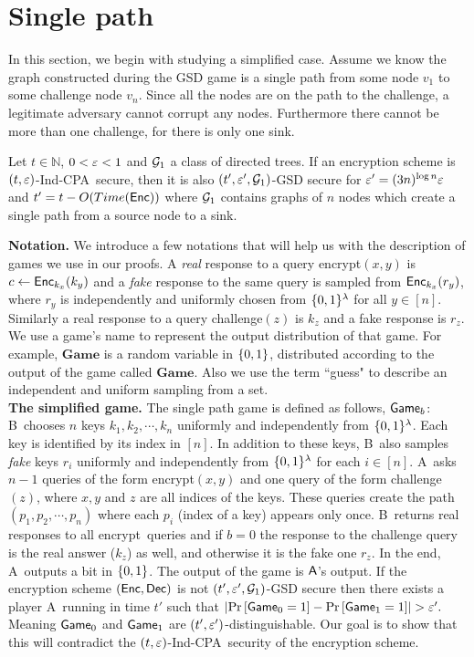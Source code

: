 \documentclass{article}
\newcommand{\tcpa}{$(t,\eps)$-Ind-CPA}
\def\B{{\sf B}}
\def\A{{\sf A}}
\newcommand{\encrypt}{{\sf encrypt}}
\newcommand{\game}{{\sf Game}}
\newcommand{\dgame}{{\mathbf{Game}}}
\def\challenge{{\sf challenge}}
\begin{document}
\section{Single path} %

In this section, we begin with studying a simplified case. Assume we know the graph constructed during the GSD game is a single path from some node $v_1$ to some challenge node $v_n$. Since all the nodes are on the path to the challenge, a legitimate adversary cannot corrupt any nodes. Furthermore there cannot be more than one challenge, for there is only one sink. 

\begin{theorem}\label{thm:s1in-1out}
Let $t \in \mathbb{N}$, $0<\varepsilon<1$ and ${\cal G}_1$ a class of directed trees. If an encryption scheme is \tcpa~secure, then it is also $(t',\varepsilon',{\cal G}_1)$-GSD secure for $\varepsilon'=(3n)^{\log n} \varepsilon $ and $t'=t-O(Time({\sf Enc}))$ where ${\cal G}_1$ contains graphs of $n$ nodes which create a single path from a source node to a sink.
\end{theorem}

  \textbf{Notation.} We introduce a few notations that will help us with the description of games we use in our proofs. A \textit{real} response to a query \encrypt$(x,y)$ is $c\leftarrow {\sf Enc}_{k_x}(k_{y})$ and a \textit{fake} response to the same query is sampled from ${\sf Enc}_{k_x}(r_{y})$, where $r_y$ is independently and uniformly chosen from $\{0,1\}^\lambda$ for all $y\in [n]$. Similarly a real response to a query \challenge$(z)$ is $k_z$ and a fake response is $r_z$. We use a game's name to represent the output distribution of that game. For example, $\dgame$ is a random variable in $\{0,1\}$, distributed according to the output of the game called $\dgame$. Also we use the term ``guess" to describe an independent and uniform sampling from a set.\\

  \textbf{The simplified game.} The single path game is defined as follows, $\game_b$: \B~chooses $n$ keys $k_1,k_2,\cdots,k_n$ uniformly and independently from $\{0,1\}^\lambda$. Each key is identified by its index in $[n]$. In addition to these keys, \B~also samples \textit{fake} keys $r_i$ uniformly and independently from $\{0,1\}^\lambda$ for each $i\in [n]$. \A~asks $n-1$ queries of the form \encrypt$(x,y)$ and one query of the form \challenge$(z)$, where $x,y$ and $z$ are all indices of the keys. These queries create the path $(p_1,p_2,\cdots, p_n)$ where each $p_i$ (index of a key) appears only once.  \B~returns real responses to all \encrypt~queries and if $b=0$ the response to the challenge query is the real answer ($k_{z}$) as well, and otherwise it is the fake one $r_{z}$. In the end, \A~outputs a bit in $\{0,1\}$. The output of the game is $\A$'s output. If the encryption scheme $({\sf Enc},{\sf Dec})$ is not $(t',\varepsilon',{\cal G}_1)$-GSD secure then there exists a player \A~running in time $t'$ such that
$\abs{\prob{\game_0=1}-\prob{\game_1=1}}> \eps'.$
Meaning $\game_0$ and $\game_1$ are $(t',\varepsilon')$-distinguishable. Our goal is to show that this will contradict the \tcpa~security of the encryption scheme. \\
\end{document}

